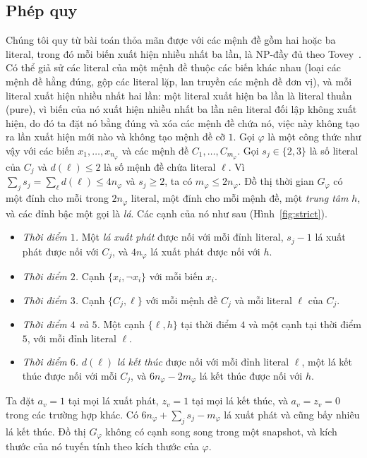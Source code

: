 \documentclass[pdflatex,sn-mathphys-num]{sn-jnl}
\theoremstyle{thmstyleone}
\theoremstyle{thmstyletwo}
\theoremstyle{thmstylethree}
\begin{document}
\subsection{Phép quy}

Chúng tôi quy từ bài toán thỏa mãn được với các mệnh đề gồm hai hoặc ba literal, trong đó mỗi biến xuất hiện nhiều nhất ba lần, là NP-đầy đủ theo Tovey~\cite{tovey1984}. Có thể giả sử các literal của một mệnh đề thuộc các biến khác nhau (loại các mệnh đề hằng đúng, gộp các literal lặp, lan truyền các mệnh đề đơn vị), và mỗi literal xuất hiện nhiều nhất hai lần: một literal xuất hiện ba lần là literal thuần (pure), vì biến của nó xuất hiện nhiều nhất ba lần nên literal đối lập không xuất hiện, do đó ta đặt nó bằng đúng và xóa các mệnh đề chứa nó, việc này không tạo ra lần xuất hiện mới nào và không tạo mệnh đề cỡ $1$. Gọi $\varphi$ là một công thức như vậy với các biến $x_1,\dots,x_{n_\varphi}$ và các mệnh đề $C_1,\dots,C_{m_\varphi}$. Gọi $s_j\in\{2,3\}$ là số literal của $C_j$ và $d(\ell)\le2$ là số mệnh đề chứa literal $\ell$. Vì $\sum_js_j=\sum_\ell d(\ell)\le4n_\varphi$ và $s_j\ge2$, ta có $m_\varphi\le2n_\varphi$. Đồ thị thời gian $G_\varphi$ có một đỉnh cho mỗi trong $2n_\varphi$ literal, một đỉnh cho mỗi mệnh đề, một \emph{trung tâm} $h$, và các đỉnh bậc một gọi là \emph{lá}. Các cạnh của nó như sau (Hình~\ref{fig:strict}).
\begin{itemize}
\item \emph{Thời điểm $1$.} Một \emph{lá xuất phát} được nối với mỗi đỉnh literal, $s_j-1$ lá xuất phát được nối với $C_j$, và $4n_\varphi$ lá xuất phát được nối với $h$.
\item \emph{Thời điểm $2$.} Cạnh $\{x_i,\lnot x_i\}$ với mỗi biến $x_i$.
\item \emph{Thời điểm $3$.} Cạnh $\{C_j,\ell\}$ với mỗi mệnh đề $C_j$ và mỗi literal $\ell$ của $C_j$.
\item \emph{Thời điểm $4$ và $5$.} Một cạnh $\{\ell,h\}$ tại thời điểm $4$ và một cạnh tại thời điểm $5$, với mỗi đỉnh literal $\ell$.
\item \emph{Thời điểm $6$.} $d(\ell)$ \emph{lá kết thúc} được nối với mỗi đỉnh literal $\ell$, một lá kết thúc được nối với mỗi $C_j$, và $6n_\varphi-2m_\varphi$ lá kết thúc được nối với $h$.
\end{itemize}
Ta đặt $a_v=1$ tại mọi lá xuất phát, $z_v=1$ tại mọi lá kết thúc, và $a_v=z_v=0$ trong các trường hợp khác. Có $6n_\varphi+\sum_js_j-m_\varphi$ lá xuất phát và cũng bấy nhiêu lá kết thúc. Đồ thị $G_\varphi$ không có cạnh song song trong một snapshot, và kích thước của nó tuyến tính theo kích thước của $\varphi$.
\end{document}
